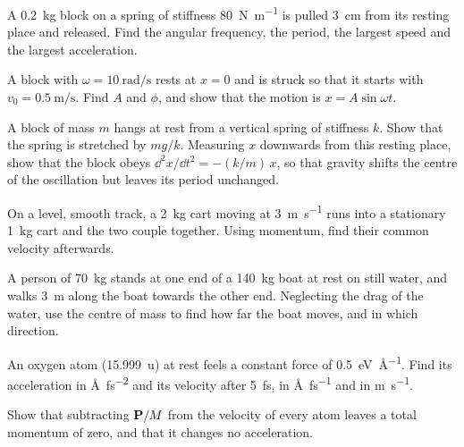 \begin{exercise}
\label{ex:ne-spring}
A \SI{0.2}{\kilogram} block on a spring of stiffness
\SI{80}{\newton\per\metre} is pulled \SI{3}{\centi\metre} from its
resting place and released. Find the angular frequency, the period, the
largest speed and the largest acceleration.
\end{exercise}

\begin{exercise}[a kick]
\label{ex:ne-kick}
A block with $\omega = \SI{10}{\radian\per\second}$ rests at $x = 0$ and
is struck so that it starts with $v_0 = \SI{0.5}{\metre\per\second}$.
Find $A$ and $\phi$, and show that the motion is $x = A\sin\omega t$.
\end{exercise}

\begin{exercise}
\label{ex:ne-hanging}
A block of mass $m$ hangs at rest from a vertical spring of stiffness
$k$. Show that the spring is stretched by $mg/k$. Measuring $x$
downwards from this resting place, show that the block obeys $\dd^2
x/\dd t^2 = -(k/m)\,x$, so that gravity shifts the centre of the
oscillation but leaves its period unchanged.
\end{exercise}

\begin{exercise}[coupling]
\label{ex:ne-coupling}
On a level, smooth track, a \SI{2}{\kilogram} cart moving at
\SI{3}{\metre\per\second} runs into a stationary \SI{1}{\kilogram} cart
and the two couple together. Using momentum, find their common velocity
afterwards.
\end{exercise}

\begin{exercise}
\label{ex:ne-boat}
A person of \SI{70}{\kilogram} stands at one end of a \SI{140}{\kilogram}
boat at rest on still water, and walks \SI{3}{\metre} along the boat
towards the other end. Neglecting the drag of the water, use the centre of mass to find
how far the boat moves, and in which direction.
\end{exercise}

\begin{exercise}
\label{ex:ne-oxygen}
An oxygen atom (\SI{15.999}{\amu}) at rest feels a constant force of
\SI{0.5}{\electronvolt\per\angstrom}. Find its acceleration in
\si{\angstrom\per\femto\second\squared} and its velocity after
\SI{5}{\femto\second}, in \si{\angstrom\per\femto\second} and in
\si{\metre\per\second}.
\end{exercise}

\begin{exercise}
\label{ex:ne-drift}
Show that subtracting $\bm{\mathrm{P}}/M$ from the velocity of every atom leaves a
total momentum of zero, and that it changes no acceleration.
\end{exercise}
